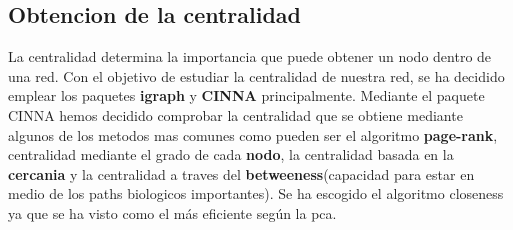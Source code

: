 \subsection{Obtencion de la centralidad}
La centralidad determina la importancia que puede obtener un nodo dentro de una red.
Con el objetivo de estudiar la centralidad de nuestra red, se ha decidido emplear los paquetes \textbf{igraph} y \textbf{CINNA} principalmente.
Mediante el paquete CINNA hemos decidido comprobar la centralidad que se obtiene mediante algunos de los metodos mas comunes como pueden ser el algoritmo \textbf{page-rank}, centralidad mediante el grado de cada \textbf{nodo}, la centralidad basada en la \textbf{cercania} y la centralidad a traves del \textbf{betweeness}(capacidad para estar en medio de los paths biologicos importantes).
Se ha escogido el algoritmo closeness ya que se ha visto como el más eficiente según la pca.
